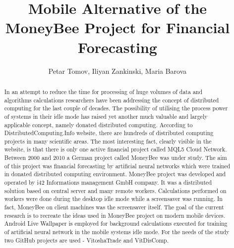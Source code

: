 \documentclass{llncs}
\begin{document}
\title{Mobile Alternative of the MoneyBee Project for Financial Forecasting} 

\author{Petar Tomov, Iliyan Zankinski, Maria Barova}




\maketitle


\begin{abstract}
In an attempt to reduce the time for processing of huge volumes of data and algorithms calculations researchers have been addressing the concept of distributed computing for the last couple of decades. The possibility of utilising the process power of systems in their idle mode has raised yet another much valuable and largely applicable concept, namely donated distributed computing. According to DistributedComputing.Info website, there are hundreds of distributed computing projects in many scientific areas. The most interesting fact, clearly visible in the website, is that there is only one active financial project called MQL5 Cloud Network. Between 2000 and 2010 a German project called MoneyBee was under study. The aim of this project was financial forecasting by artificial neural networks which were trained in donated distributed computing environment. MoneyBee project was developed and operated by i42 Informations management GmbH company. It was a distributed solution based on central server and many remote workers. Calculations performed on workers were done during the desktop idle mode while a screensaver was running. In fact, MoneyBee on client machines was the screensaver itself. The goal of the current research is to recreate the ideas used in MoneyBee project on modern mobile devices. Android Live Wallpaper is employed for background calculations executed for training of artificial neural network in the mobile systems idle mode. For the needs of the study two GitHub projects are used - VitoshaTrade and VitDisComp.

\end{abstract}
\end{document}
